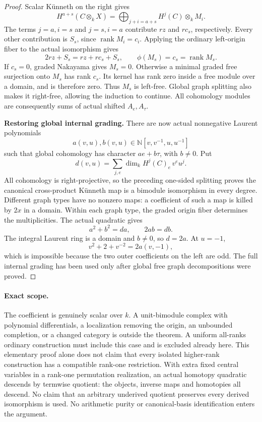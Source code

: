 \begin{proof}
Scalar K\"unneth on the right gives
\[
 H^{a+s}(C\otimes_kX)
       =\bigoplus_{j+i=a+s}H^j(C)\otimes_kM_i.
\]
The terms \(j=a,i=s\) and \(j=s,i=a\) contribute
\(rz\) and \(rc_s\), respectively.
Every other contribution is \(S_s\), since
\(\operatorname{rank}M_i=c_i\).
Applying the ordinary left-origin fiber to the
actual isomorphism gives
\begin{equation}\label{eq:rankOneOriginInduction}
 2rz+S_s=rz+rc_s+S_s,\qquad
 \phi(M_s)=c_s=\operatorname{rank}M_s.
\end{equation}
If \(c_s=0\), graded Nakayama gives \(M_s=0\).
Otherwise a minimal graded free surjection onto
\(M_s\) has rank \(c_s\). Its kernel has rank zero
inside a free module over a domain, and is therefore
zero. Thus \(M_s\) is left-free.
Global graph splitting also makes it right-free,
allowing the induction to continue.
All cohomology modules are consequently sums of
actual shifted \(A_e,A_\tau\).

\par\smallskip\noindent\textbf{Restoring global internal grading.}\quad
There are now actual nonnegative Laurent polynomials
\[
 a(v,u),b(v,u)\in\mathbb N[v,v^{-1},u,u^{-1}]
\]
such that global cohomology has character \(ae+b\tau\),
with \(b\ne0\). Put
\[
 d(v,u)=\sum_{j,e}\dim_kH^j(C)_e\,v^eu^j.
\]
All cohomology is right-projective, so the preceding
one-sided splitting proves the canonical cross-product
K\"unneth map is a bimodule isomorphism in every degree.
Different graph types have no nonzero maps: a coefficient
of such a map is killed by \(2x\) in a domain.
Within each graph type, the graded origin fiber
determines the multiplicities. The actual quadratic gives
\[
 a^2+b^2=da,\qquad 2ab=db.
\]
The integral Laurent ring is a domain and \(b\ne0\),
so \(d=2a\). At \(u=-1\),
\[
                    v^2+2+v^{-2}=2a(v,-1),
\]
which is impossible because the two outer coefficients
on the left are odd.
The full internal grading has been used only after
global free graph decompositions were proved.
\end{proof}

\paragraph{Exact scope.}
The coefficient is genuinely scalar over \(k\).
A unit-bimodule complex with polynomial differentials,
a localization removing the origin, an unbounded
completion, or a changed category is outside the theorem.
A uniform all-ranks ordinary construction must include
this case and is excluded already here.
This elementary proof alone does not claim that every
isolated higher-rank construction has a compatible
rank-one restriction.
With extra fixed central variables in a rank-one
permutation realization, an actual homotopy quadratic
descends by termwise quotient: the objects, inverse
maps and homotopies all descend. No claim that an
arbitrary underived quotient preserves every derived
isomorphism is used. No arithmetic purity or
canonical-basis identification enters the argument.

